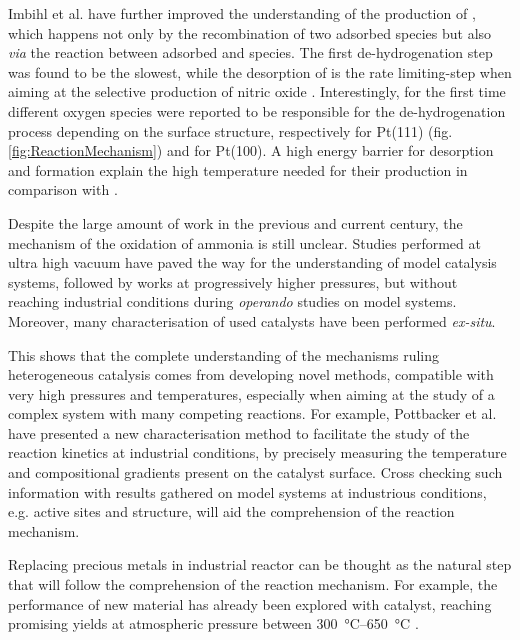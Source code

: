 Imbihl et al. \parencite*{Imbihl2007} have further improved the understanding of the production of , which happens not only by the recombination of two adsorbed  species but also \textit{via} the reaction between adsorbed  and  species.
The first de-hydrogenation step was found to be the slowest, while the desorption of  is the rate limiting-step when aiming at the selective production of nitric oxide \parencite{NovellLeruth2008}.
Interestingly, for the first time different oxygen species were reported to be responsible for the de-hydrogenation process depending on the surface structure, respectively  for Pt(111) (fig. \ref{fig:ReactionMechanism}) and  for Pt(100).
A high energy barrier for  desorption and  formation explain the high temperature needed for their production in comparison with .

Despite the large amount of work in the previous and current century, the mechanism of the oxidation of ammonia is still unclear.
Studies performed at ultra high vacuum have paved the way for the understanding of model catalysis systems, followed by works at progressively higher pressures, but without reaching industrial conditions during \textit{operando} studies on model systems.
Moreover, many characterisation of used catalysts have been performed \textit{ex-situ}.

This shows that the complete understanding of the mechanisms ruling heterogeneous catalysis comes from developing novel methods, compatible with very high pressures and temperatures, especially when aiming at the study of a complex system with many competing reactions.
For example, Pottbacker et al. \parencite*{Pottbacker2022} have presented a new characterisation method to facilitate the study of the reaction kinetics at industrial conditions, by precisely measuring the temperature and compositional gradients present on the catalyst surface.
Cross checking such information with results gathered on model systems at industrious conditions, e.g. active sites and structure, will aid the comprehension of the reaction mechanism.

Replacing precious metals in industrial reactor can be thought as the natural step that will follow the comprehension of the reaction mechanism.
For example, the performance of new material has already been explored with  catalyst, reaching promising  yields at atmospheric pressure between \qtyrange{300}{650}{\degreeCelsius} \parencite{Ruan2022}.

